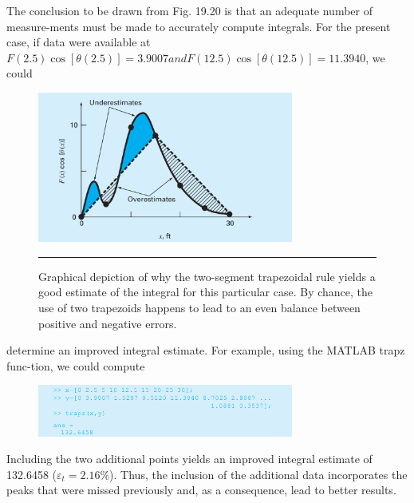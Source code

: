 \documentclass[../main.tex]{subfiles}
\begin{document}
The conclusion to be drawn from Fig. 19.20 is that an adequate number of measure-ments must be made to accurately compute integrals. For the present case, if data were
available at $F(2.5) \cos [\theta(2.5)] = 3.9007 and F(12.5) \cos [\theta(12.5)] = 11.3940$, we could

\pagebreak

\begin{figure}[hbt!]
	\centering
	\includegraphics[width=0.75\textwidth]{pic.004}
	\caption{\textsf{Graphical depiction of why the two-segment trapezoidal rule yields a good estimate of the
integral for this particular case. By chance, the use of two trapezoids happens to lead to an
even balance between positive and negative errors.}} 

\hrule
	\label{pic.004}
\end{figure}

\vspace{0.2in}

determine an improved integral estimate. For example, using the MATLAB trapz func-tion, we could compute

\begin{figure}[hbt!]
	\centering
	\includegraphics[width=0.75\textwidth]{pic.005}
	\label{pic.005}
\end{figure}

Including the two additional points yields an improved integral estimate of 132.6458 ($\varepsilon_t = 2.16\%$). Thus, the inclusion of the additional data incorporates the peaks that were
missed previously and, as a consequence, lead to better results.

\vspace{0.3in}
\end{document}
